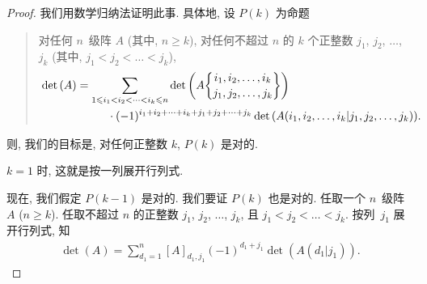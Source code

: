 \documentclass[../libro.tex]{subfiles}
\begin{document}
\begin{proof}
    我们用数学归纳法证明此事.
    具体地, 设 \(P(k)\) 为命题
    \begin{quotation}
        对任何 \(n\)~级阵 \(A\)
        (其中, \(n \geq k\)),
        对任何不超过 \(n\) 的 \(k\) 个正整数
        \(j_1\), \(j_2\), \(\dots\), \(j_k\)
        (其中, \(j_1 < j_2 < \dots < j_k\)),
        \begin{align*}
            &
            \det {(A)}
            = \sum_{1 \leq i_1 < i_2 < \dots < i_k \leq n}
            {\det {\left(
                        A\submat{i_1, i_2, \dots, i_k}%
                        {j_1, j_2, \dots, j_k}
            \right)}}
            \\
            &
            \qquad \qquad \qquad
            \cdot (-1)^{i_1 + i_2 + \dots + i_k
            + j_1 + j_2 + \dots + j_k}
            \det {(A({i_1,i_2,\dots,i_k}|{j_1,j_2,\dots,j_k}))}.
        \end{align*}
    \end{quotation}
    则, 我们的目标是,
    对任何正整数 \(k\), \(P(k)\) 是对的.

    \(k = 1\) 时, 这就是按一列展开行列式.

    现在, 我们假定 \(P(k - 1)\) 是对的.
    我们要证 \(P(k)\) 也是对的.
    任取一个 \(n\)~级阵~\(A\) (\(n \geq k\)).
    任取不超过 \(n\) 的正整数
    \(j_1\), \(j_2\), \(\dots\), \(j_k\),
    且 \(j_1 < j_2 < \dots < j_k\).
    按列~\(j_1\) 展开行列式,
    知
    \begin{align*}
        \det {(A)} = \sum_{d_1 = 1}^{n}
        {[A]_{d_1,j_1} (-1)^{d_1 + j_1} \det {(A(d_1|j_1))}}.
    \end{align*}


\end{proof}
\end{document}

